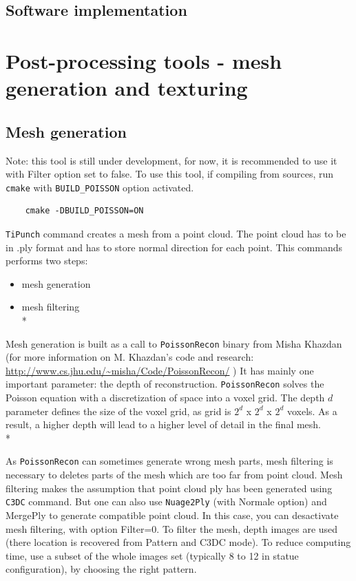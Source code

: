 \subsection{Software implementation}


\section{Post-processing tools - mesh generation and texturing}

\subsection{Mesh generation}

Note: this tool is still under development, for now, it is recommended to use it with Filter option set to false. To use this tool, if compiling from sources, run {\tt cmake} with {\tt BUILD\_POISSON} option activated.
\begin{verbatim}
    cmake -DBUILD_POISSON=ON
\end{verbatim}

{\tt TiPunch} command creates a mesh from a point cloud. The point cloud has to be in .ply format and has to store normal direction for each point.
This commands performs two steps:
\begin{itemize}
\item mesh generation
\item mesh filtering\\*
\end{itemize}
Mesh generation is built as a call to {\tt PoissonRecon} binary from Misha Khazdan (for more information on M. Khazdan's code and research: \url{http://www.cs.jhu.edu/~misha/Code/PoissonRecon/} )
It has mainly one important parameter: the depth of reconstruction. {\tt PoissonRecon} solves the Poisson equation with a discretization of space into a voxel grid. The depth $d$ parameter defines the size of the voxel grid, as grid is $2^d$ x $2^d$ x $2^d$ voxels.
As a result, a higher depth will lead to a higher level of detail in the final mesh.\\*

As {\tt PoissonRecon} can sometimes generate wrong mesh parts, mesh filtering is necessary to deletes parts of the mesh which are too far from point cloud.
Mesh filtering makes the assumption that point cloud ply has been generated using {\tt C3DC} command. But one can also use {\tt Nuage2Ply} (with Normale option) and MergePly to generate compatible point cloud. In this case, you can desactivate mesh filtering, with option Filter=0.
To filter the mesh, depth images are used (there location is recovered from Pattern and C3DC mode). To reduce computing time, use a subset of the whole images set (typically 8 to 12 in statue configuration), by choosing the right pattern.

